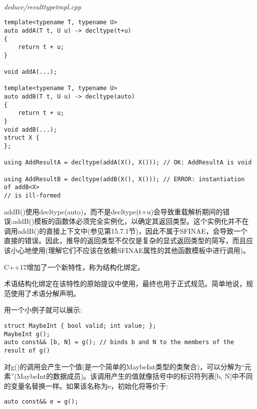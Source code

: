 \hspace*{\fill} \\ %
\noindent
\textit{deduce/resulttypetmpl.cpp}
\begin{lstlisting}[style=styleCXX]
template<typename T, typename U>
auto addA(T t, U u) -> decltype(t+u)
{
	return t + u;
}

void addA(...);

template<typename T, typename U>
auto addB(T t, U u) -> decltype(auto)
{
	return t + u;
}
void addB(...);
struct X {
};

using AddResultA = decltype(addA(X(), X())); // OK: AddResultA is void

using AddResultB = decltype(addB(X(), X())); // ERROR: instantiation of addB<X>
// is ill-formed
\end{lstlisting}

addB()使用decltype(auto)，而不是decltype(t+u)会导致重载解析期间的错误:addB()模板的函数体必须完全实例化，以确定其返回类型。这个实例化并不在调用addB()的直接上下文中(参见第15.7.1节)，因此不属于SFINAE，会导致一个直接的错误。因此，推导的返回类型不仅仅是复杂的显式返回类型的简写，而且应该小心地使用(理解它们不应该在依赖SFINAE属性的其他函数模板中进行调用)。


C++17增加了一个新特性，称为结构化绑定。

\begin{tcolorbox}[colback=webgreen!5!white,colframe=webgreen!75!black]
\hspace*{0.75cm}术语结构化绑定在该特性的原始提议中使用，最终也用于正式规范。简单地说，规范使用了术语分解声明。
\end{tcolorbox}

用一个小例子就可以展示:

\begin{lstlisting}[style=styleCXX]
struct MaybeInt { bool valid; int value; };
MaybeInt g();
auto const&& [b, N] = g(); // binds b and N to the members of the result of g()
\end{lstlisting}

对g()的调用会产生一个值(是一个简单的MaybeInt类型的类聚合)，可以分解为“元素”(MaybeInt的数据成员)。该调用产生的值就像括号中的标识符列表[b, N]中不同的变量名替换一样。如果该名称为e，初始化将等价于:

\begin{lstlisting}[style=styleCXX]
auto const&& e = g();
\end{lstlisting}

